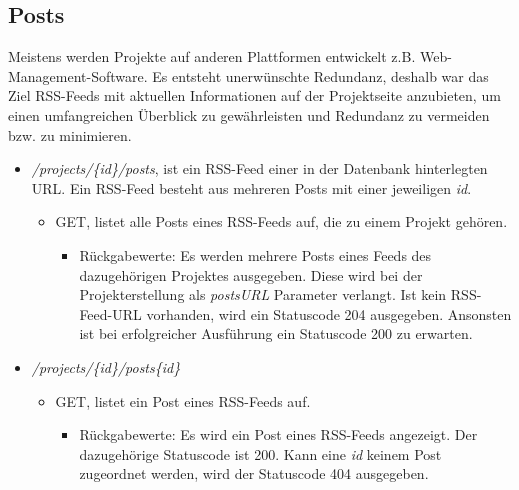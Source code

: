 \documentclass[12pt]{scrartcl}
\begin{document}
\subsection{Posts}
Meistens werden Projekte auf anderen Plattformen entwickelt z.B. Web-Management-Software. Es entsteht unerwünschte Redundanz, deshalb war das Ziel RSS-Feeds mit aktuellen Informationen auf der Projektseite anzubieten, um einen umfangreichen Überblick zu gewährleisten und Redundanz zu vermeiden bzw. zu minimieren.    
	\begin{itemize}
		\item \emph{/projects/\{id\}/posts}, ist ein RSS-Feed einer in der Datenbank hinterlegten URL. Ein RSS-Feed besteht aus mehreren Posts mit einer jeweiligen \emph{id}.
		\begin{itemize}
			\item GET, listet alle Posts eines RSS-Feeds auf, die zu einem Projekt gehören.
			\begin{itemize}
				\item Rückgabewerte: Es werden mehrere Posts eines Feeds des dazugehörigen Projektes ausgegeben. Diese wird bei der Projekterstellung als \emph{postsURL} Parameter verlangt. Ist kein RSS-Feed-URL vorhanden, wird ein Statuscode 204 ausgegeben. Ansonsten ist bei erfolgreicher Ausführung ein Statuscode 200 zu erwarten.
			\end{itemize}
		\end{itemize}
		\item \emph{/projects/\{id\}/posts\{id\}}
		\begin{itemize}
			\item GET, listet ein Post eines RSS-Feeds auf.
			\begin{itemize}
				\item Rückgabewerte: Es wird ein Post eines RSS-Feeds angezeigt. Der dazugehörige Statuscode ist 200. Kann eine \emph{id} keinem Post zugeordnet werden, wird der Statuscode 404 ausgegeben.  
			\end{itemize}
		\end{itemize} 	
	\end{itemize}
\end{document}
